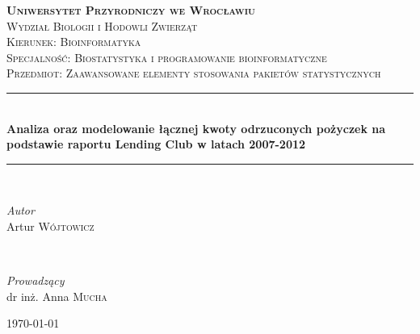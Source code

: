 \documentclass[11pt]{article}
\begin{document}

\begin{titlepage}

	\newcommand{\HRule}{\rule{\linewidth}{0.5mm}}
	
	\center
	
	
	\textsc{\LARGE \textbf{Uniwersytet Przyrodniczy we Wrocławiu}}\\[1cm] 
	
	\textsc{\Large Wydział Biologii i Hodowli Zwierząt}\\[0.5cm] 
	
	\textsc{\large Kierunek: Bioinformatyka}\\[0.5cm] 
	
	\textsc{\large Specjalność: Biostatystyka i programowanie bioinformatyczne}\\[0.5cm]
	
	\textsc{\large Przedmiot: Zaawansowane elementy stosowania pakietów statystycznych}\\[0.5cm]
	
	
	\HRule\\[0.4cm]
	
	{\huge\bfseries Analiza oraz modelowanie łącznej kwoty odrzuconych pożyczek na podstawie raportu Lending Club w latach 2007-2012}\\[0.4cm] 
	
	\HRule\\[1.5cm]
	
	
	\begin{minipage}{0.4\textwidth}
		\begin{flushleft}
			\large
			\textit{Autor}\\
			Artur \textsc{Wójtowicz}
		\end{flushleft}
	\end{minipage}
	~
	\begin{minipage}{0.4\textwidth}
		\begin{flushright}
			\large
			\textit{Prowadzący}\\
			dr inż. Anna \textsc{Mucha} %
		\end{flushright}
	\end{minipage}
	
	
	\vfill\vfill\vfill
	{\large\today}
	\vfill 
	
\end{titlepage}
\end{document}
